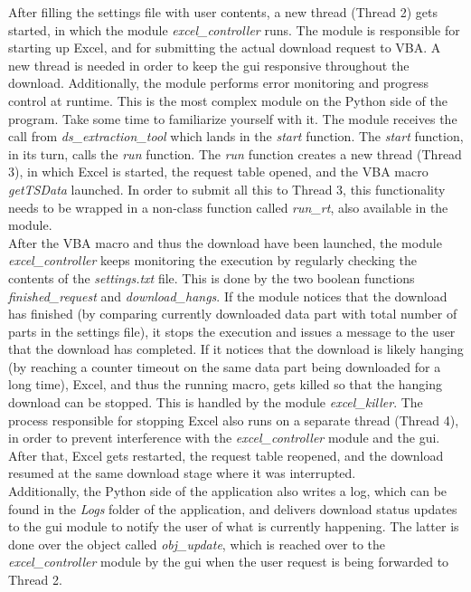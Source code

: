 After filling the settings file with user contents, a new thread (Thread 2) gets started, in which the module \textit{excel\_controller} runs. The module is responsible for starting up Excel, and for submitting the actual download request to VBA. A new thread is needed in order to keep the gui responsive throughout the download. Additionally, the module performs error monitoring and progress control at runtime. This is the most complex module on the Python side of the program. Take some time to familiarize yourself with it. The module receives the call from \textit{ds\_extraction\_tool} which lands in the \textit{start} function. The \textit{start} function, in its turn, calls the \textit{run} function. The \textit{run} function creates a new thread (Thread 3), in which Excel is started, the request table opened, and the VBA macro \textit{getTSData} launched. In order to submit all this to Thread 3, this functionality needs to be wrapped in a non-class function called \textit{run\_rt}, also available in the module. \\

After the VBA macro and thus the download have been launched, the module \textit{excel\_controller} keeps monitoring the execution by regularly checking the contents of the \textit{settings.txt} file. This is done by the two boolean functions \textit{finished\_request} and \textit{download\_hangs}. If the module notices that the download has finished (by comparing currently downloaded data part with total number of parts in the settings file), it stops the execution and issues a message to the user that the download has completed. If it notices that the download is likely hanging (by reaching a counter timeout on the same data part being downloaded for a long time), Excel, and thus the running macro, gets killed so that the hanging download can be stopped. This is handled by the module \textit{excel\_killer}. The process responsible for stopping Excel also runs on a separate thread (Thread 4), in order to prevent interference with the \textit{excel\_controller} module and the gui. After that, Excel gets restarted, the request table reopened, and the download resumed at the same download stage where it was interrupted. \\

Additionally, the Python side of the application also writes a log, which can be found in the \textit{Logs} folder of the application, and delivers download status updates to the gui module to notify the user of what is currently happening. The latter is done over the object called \textit{obj\_update}, which is reached over to the \textit{excel\_controller} module by the gui when the user request is being forwarded to Thread 2. \\

